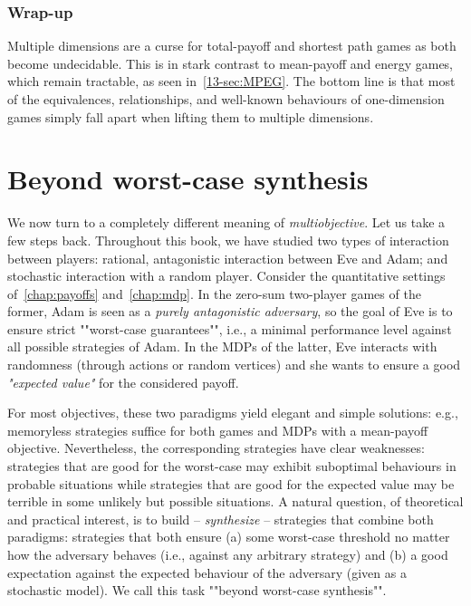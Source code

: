 \subsubsection*{Wrap-up} Multiple dimensions are a curse for total-payoff and shortest path games as both become undecidable. This is in stark contrast to mean-payoff and energy games, which remain tractable, as seen in~\cref{13-sec:MPEG}. The bottom line is that most of the equivalences, relationships, and well-known behaviours of one-dimension games simply fall apart when lifting them to multiple dimensions.


\section{Beyond worst-case synthesis}
\label{13-sec:bwc}

We now turn to a completely different meaning of \textit{multiobjective}. Let us take a few steps back. Throughout this book, we have studied two types of interaction between players: rational, antagonistic interaction between Eve and Adam; and stochastic interaction with a random player. Consider the quantitative settings of~\cref{chap:payoffs} and~\cref{chap:mdp}. In the zero-sum two-player games of the former, Adam is seen as a \textit{purely antagonistic adversary}, so the goal of Eve is to ensure strict ""worst-case guarantees"", i.e., a minimal performance level against all possible strategies of Adam. In the MDPs of the latter, Eve interacts with randomness (through actions or random vertices) and she wants to ensure a good \textit{"expected value"} for the considered payoff.

For most objectives, these two paradigms yield elegant and simple solutions: e.g., memoryless strategies suffice for both games and MDPs with a mean-payoff objective. Nevertheless, the corresponding strategies have clear weaknesses: strategies that are good for the worst-case may exhibit suboptimal behaviours in probable situations while strategies that are good for the expected value may be terrible in some unlikely but possible situations. A natural question, of theoretical and practical interest, is to build -- \textit{synthesize} -- strategies that combine both paradigms: strategies that both ensure (a) some worst-case threshold no matter how the adversary behaves (i.e., against any arbitrary strategy) and (b) a good expectation against the expected behaviour of the adversary (given as a stochastic model). We call this task ""beyond worst-case synthesis"".

